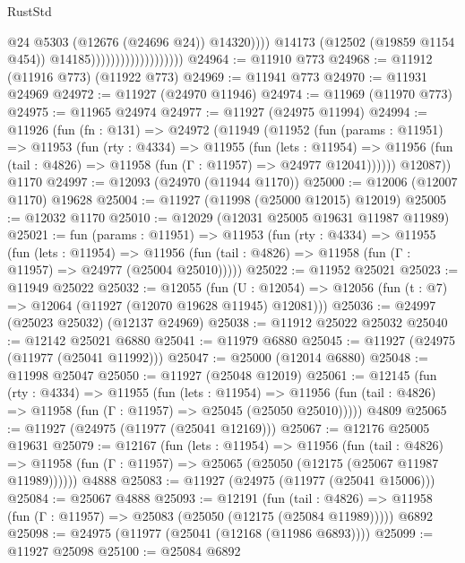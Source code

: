 \begin{lexlean}{RustStd}
\begin{coremodule}
                                                  @24
                                                  @5303
                                                  (@12676 (@24696 @24))
                                                  @14320))))
                                          @14173
                                          (@12502 (@19859 @1154 @454))
                                          @14185)))))))))))))))))))
@24964 := @11910 @773
@24968 := @11912 (@11916 @773) (@11922 @773)
@24969 := @11941 @773
@24970 := @11931 @24969
@24972 := @11927 (@24970 @11946)
@24974 := @11969 (@11970 @773)
@24975 := @11965 @24974
@24977 := @11927 (@24975 @11994)
@24994 := @11926
    (fun (fn : @131) =>
    @24972
      (@11949
        (@11952
          (fun (params : @11951) =>
          @11953
            (fun (rty : @4334) =>
            @11955
              (fun (lets : @11954) =>
              @11956 (fun (tail : @4826) => @11958 (fun (Γ : @11957) => @24977 @12041))))))
        @12087))
    @1170
@24997 := @12093 (@24970 (@11944 @1170))
@25000 := @12006 (@12007 @1170) @19628
@25004 := @11927 (@11998 (@25000 @12015) @12019)
@25005 := @12032 @1170
@25010 := @12029 (@12031 @25005 @19631 @11987 @11989)
@25021 := fun (params : @11951) =>
  @11953
    (fun (rty : @4334) =>
    @11955
      (fun (lets : @11954) =>
      @11956 (fun (tail : @4826) => @11958 (fun (Γ : @11957) => @24977 (@25004 @25010)))))
@25022 := @11952 @25021
@25023 := @11949 @25022
@25032 := @12055
    (fun (U : @12054) => @12056 (fun (t : @7) => @12064 (@11927 (@12070 @19628 @11945) @12081)))
@25036 := @24997 (@25023 @25032) (@12137 @24969)
@25038 := @11912 @25022 @25032
@25040 := @12142 @25021 @6880
@25041 := @11979 @6880
@25045 := @11927 (@24975 (@11977 (@25041 @11992)))
@25047 := @25000 (@12014 @6880)
@25048 := @11998 @25047
@25050 := @11927 (@25048 @12019)
@25061 := @12145
    (fun (rty : @4334) =>
    @11955
      (fun (lets : @11954) =>
      @11956 (fun (tail : @4826) => @11958 (fun (Γ : @11957) => @25045 (@25050 @25010)))))
    @4809
@25065 := @11927 (@24975 (@11977 (@25041 @12169)))
@25067 := @12176 @25005 @19631
@25079 := @12167
    (fun (lets : @11954) =>
    @11956
      (fun (tail : @4826) =>
      @11958 (fun (Γ : @11957) => @25065 (@25050 (@12175 (@25067 @11987 @11989))))))
    @4888
@25083 := @11927 (@24975 (@11977 (@25041 @15006)))
@25084 := @25067 @4888
@25093 := @12191
    (fun (tail : @4826) => @11958 (fun (Γ : @11957) => @25083 (@25050 (@12175 (@25084 @11989)))))
    @6892
@25098 := @24975 (@11977 (@25041 (@12168 (@11986 @6893))))
@25099 := @11927 @25098
@25100 := @25084 @6892

\end{coremodule}
\end{lexlean}
